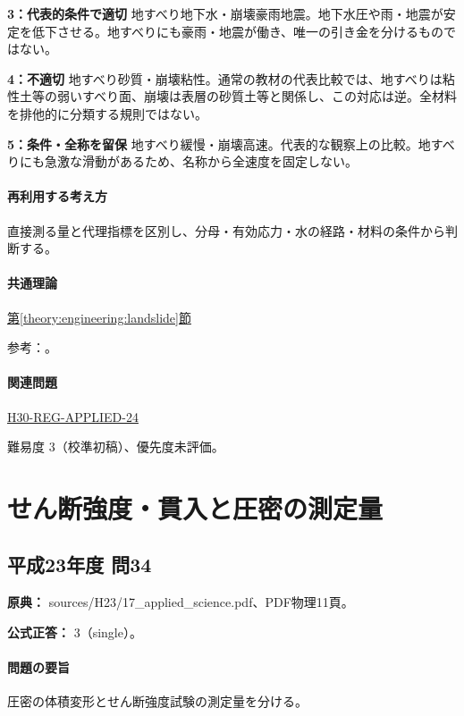 \noindent\textbf{3：代表的条件で適切} 地すべり地下水・崩壊豪雨地震。地下水圧や雨・地震が安定を低下させる。地すべりにも豪雨・地震が働き、唯一の引き金を分けるものではない。\par

\noindent\textbf{4：不適切} 地すべり砂質・崩壊粘性。通常の教材の代表比較では、地すべりは粘性土等の弱いすべり面、崩壊は表層の砂質土等と関係し、この対応は逆。全材料を排他的に分類する規則ではない。\par

\noindent\textbf{5：条件・全称を留保} 地すべり緩慢・崩壊高速。代表的な観察上の比較。地すべりにも急激な滑動があるため、名称から全速度を固定しない。\par

\paragraph{再利用する考え方} 直接測る量と代理指標を区別し、分母・有効応力・水の経路・材料の条件から判断する。

\paragraph{共通理論} \hyperref[theory:engineering:landslide]{第\ref*{theory:engineering:landslide}節}

\par 参考：\cite{eng52_landslide_ref}。

\paragraph{関連問題} \hyperref[q:h30-reg-applied-24]{H30-REG-APPLIED-24}

\par 難易度 3（校準初稿）、優先度未評価。

\section{せん断強度・貫入と圧密の測定量}

\subsection{平成23年度 問34}
\label{q:h23-reg-applied-34}

\noindent\textbf{原典：} sources/H23/17\_applied\_science.pdf、PDF物理11頁。

\textbf{公式正答：} 3（single）。

\paragraph{問題の要旨} 圧密の体積変形とせん断強度試験の測定量を分ける。

